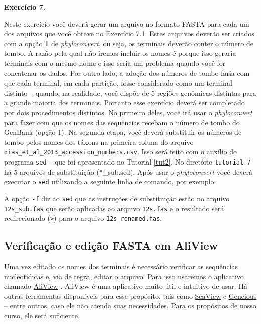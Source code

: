 \begin{refsection}
\begin{blackBlock}{\textbf{Exercício 7.}}\label{tut7:ex:ex2}

Neste exercício você deverá gerar um arquivo no formato FASTA para cada um dos arquivos que você obteve no Exercício 7.1. Estes arquivos deverão ser criados com a opção \textbf{1} de \textit{phyloconvert}, ou seja, os terminais deverão conter o número de tombo. A razão pela qual não iremos incluir os nomes é porque isso geraria terminais com o mesmo nome e isso seria um problema quando você for concatenar os dados. Por outro lado, a adoção dos números de tombo faria com que cada terminal, em cada partição, fosse considerado como um terminal distinto -- quando, na realidade, você dispõe de 5 regiões genômicas distintas para a grande maioria dos terminais. Portanto esse exercício deverá ser completado por dois procedimentos distintos. No primeiro deles, você irá usar o \textit{phyloconvert} para fazer com que os nomes das sequências recebam o número de tombo do GenBank (opção 1). Na segunda etapa, você deverá substituir os números de tombo pelos nomes dos táxons na primeira coluna do arquivo \texttt{dias\_et\_al\_2013\_accession\_numbers.csv}. Isso será feito com o auxílio do programa \texttt{sed} -- que foi apresentado no Tutorial \ref{tut2}. No diretório \texttt{tutorial\_7} há 5 arquivos de substituição (*\_sub.sed). Após usar o \textit{phyloconvert} você deverá executar o \texttt{sed} utilizando a seguinte linha de comando, por exemplo:\\

\end{blackBlock}

A opção \texttt{-f} diz ao \texttt{sed} que as instruções de substituição estão no arquivo \texttt{12s\_sub.fas} que serão aplicadas ao arquivo \texttt{12s.fas} e o resultado será redirecionado (\texttt{>}) para o arquivo \texttt{12s\_renamed.fas}.

\subsection{Verificação e edição FASTA em AliView}\label{tut7:handling_files:AliView}

Uma vez editado os nomes dos terminais é necessário verificar as sequências nucleotídicas e, via de regra, editar o arquivo. Para isso usaremos o aplicativo chamado \href{https://ormbunkar.se/aliview/}{AliView} \parencite{larson_2014}. AliView é uma aplicativo muito útil e intuitivo de usar. Há outras ferramentas disponíveis para esse propósito, tais como \href{http://pbil.univ-lyon1.fr/software/seaview3.html#:~:text=SeaView%20is%20a%20graphical%20multiple,to%20locally%20improve%20the%20alignment.}{SeaView} e \href{https://www.geneious.com/}{Geneious} -- entre outros, caso ele não atenda suas necessidades. Para os propósitos de nosso curso, ele será suficiente.


\end{refsection}
